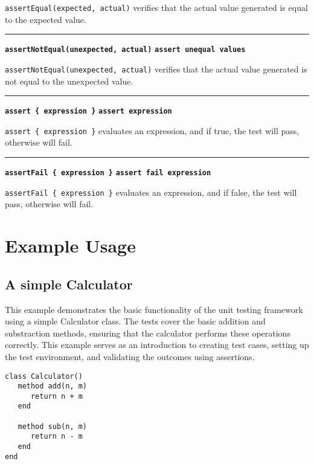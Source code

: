 \documentclass[letterpaper,12pt]{article}
\begin{document}
\vspace{0.1cm}
\noindent
\texttt{assertEqual(expected, actual)} verifies that the actual value generated is equal to the expected value.

\bigskip
\hrule\vspace{0.1cm}
\noindent
{\tt\bf assertNotEqual(unexpected, actual)} \hfill {\tt\bf assert unequal values}

\vspace{0.1cm}
\noindent
\texttt{assertNotEqual(unexpected, actual)} verifies that the actual value generated is not equal to the unexpected value.

\bigskip
\hrule\vspace{0.1cm}
\noindent
{\tt\bf assert \{ expression \}} \hfill {\tt\bf assert expression}

\vspace{0.1cm}
\noindent
\texttt{assert \{ expression \}} evaluates an expression, and if true, the test will pass, otherwise will fail.

\bigskip
\hrule\vspace{0.1cm}
\noindent
{\tt\bf assertFail \{ expression \}} \hfill {\tt\bf assert fail expression}

\vspace{0.1cm}
\noindent
\texttt{assertFail \{ expression \}} evaluates an expression, and if false, the test will pass, otherwise will fail.

\newpage\section{Example Usage}

\subsection{A simple Calculator}

This example demonstrates the basic functionality of the unit testing framework using a simple Calculator class. The tests cover the basic addition and substraction methods, ensuring that the calculator performs these operations correctly. This example serves as an introduction to creating test cases, setting up the test environment, and validating the outcomes using assertions.

\bigskip{}
\begin{verbatim}
class Calculator()
   method add(n, m)
      return n + m
   end

   method sub(n, m)
      return n - m
   end
end
\end{verbatim}
\end{document}
